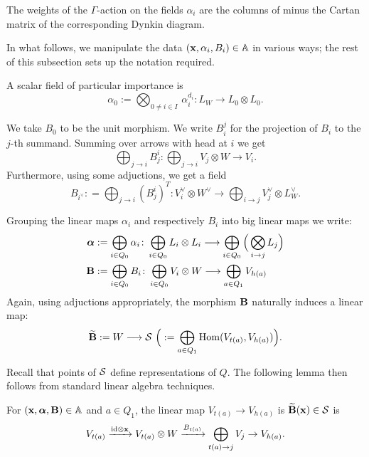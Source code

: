 \documentclass{amsart}
\newcommand{\balpha}{\boldsymbol{\alpha}}
\theoremstyle{definition}
\begin{document}
\begin{remark}\label{rm:cartan}
The weights of the $\Gamma$-action on the fields $\alpha_i$ are the columns of minus the Cartan matrix of the corresponding Dynkin diagram.
\end{remark}

In what follows, we manipulate the data $(\mathbf{x}, \alpha_i, B_i) \in \mathbb{A}$ in various ways; the rest of this subsection sets up the notation required.

\begin{notation}
A scalar field of particular importance is $$\alpha_0:= \bigotimes_{0 \neq i \in I} \,\alpha_i^{d_i}: L_W \rightarrow L_0 \otimes L_0.$$
\end{notation}

\begin{notation}
We take $B_0$ to be the unit morphism.
We write $B_i^j$ for the projection of $B_i$ to the $j$-th summand. 
Summing over arrows with head at $i$ we get $$\bigoplus_{j \rightarrow i} B_j^i \colon \bigoplus_{j \rightarrow i} V_j \otimes W \longrightarrow V_i.$$
Furthermore, using some adjuctions, we get a field $$B_{i^\vee}: = \bigoplus_{j \rightarrow i} (B_j^i)^T \colon V_i^\vee \otimes W^\vee \longrightarrow \bigoplus_{i \rightarrow j} V_j^\vee \otimes L_W^\vee.$$
\end{notation}

\begin{notation}
Grouping the linear maps $\alpha_i$ and respectively $B_i$ into big linear maps we write: 
\begin{align*}
\balpha &:= \bigoplus_{i\in Q_0} \alpha_i \colon \bigoplus_{i\in Q_0} L_i \otimes L_i \longrightarrow \bigoplus_{i \in Q_0} \Big( \bigotimes_{i \rightarrow j} L_j \Big) \\
\bfB &:= \bigoplus_{i\in Q_0} B_i \colon \bigoplus_{i\in Q_0} V_i \otimes W \longrightarrow \bigoplus_{a \in Q_1} V_{h(a)}
\end{align*}
Again, using adjuctions appropriately, the morphism $\mathbf{B}$ naturally induces a linear map:
$$\widetilde{\mathbf{B}} := W \longrightarrow \mathcal{S} \,\,\Big(:= \bigoplus_{a \in Q_1} \operatorname{Hom}(V_{t(a)}, V_{h(a)})\Big).$$
\end{notation}

Recall that points of $\mathcal{S}$ define representations of $Q$.
The following lemma then follows from standard linear algebra techniques.

\begin{lemma}\label{lem:Btilde}
For $(\bfx, \balpha, \bfB) \in \bA$ and $a \in Q_1$, the linear map $V_{t(a)} \rightarrow V_{h(a)}$ is $\widetilde{\mathbf{B}}(\mathbf{x}) \in \mathcal{S}$ is 
$$V_{t(a)} \xrightarrow{\textup{id} \otimes \mathbf{x}} V_{t(a)} \otimes W \xrightarrow{B_{t(a)}} \bigoplus_{t(a) \rightarrow j} V_j \rightarrow V_{h(a)}.$$
\end{lemma}
\end{document}
